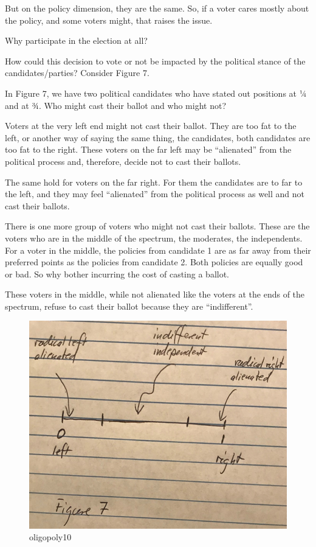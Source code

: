 \documentclass[
]{book}
\begin{document}
But on the policy dimension, they are the same. So, if a voter cares mostly about the policy, and some voters might, that raises the issue.

Why participate in the election at all?

How could this decision to vote or not be impacted by the political stance of the candidates/parties?
Consider Figure 7.

In Figure 7, we have two political candidates who have stated out positions at ¼ and at ¾. Who might cast their ballot and who might not?

Voters at the very left end might not cast their ballot. They are too fat to the left, or another way of saying the same thing, the candidates, both candidates are too fat to the right. These voters on the far left may be ``alienated'' from the political process and, therefore, decide not to cast their ballots.

The same hold for voters on the far right. For them the candidates are to far to the left, and they may feel ``alienated'' from the political process as well and not cast their ballots.

There is one more group of voters who might not cast their ballots. These are the voters who are in the middle of the spectrum, the moderates, the independents. For a voter in the middle, the policies from candidate 1 are as far away from their preferred points as the policies from candidate 2. Both policies are equally good or bad. So why bother incurring the cost of casting a ballot.

These voters in the middle, while not alienated like the voters at the ends of the spectrum, refuse to cast their ballot because they are ``indifferent''.

\begin{figure}

{\centering \includegraphics[width=0.5\linewidth]{img/oligopoly/fig10} 

}

\caption{oligopoly10}\label{fig:oligopoly10}
\end{figure}
\end{document}
